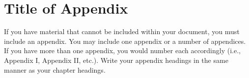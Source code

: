 \chapter{Title of Appendix}
If you have material that cannot be included within your document, you must include an appendix.
You may include one appendix or a number of appendices. If you have more than one appendix, you would number each accordingly (i.e., Appendix I, Appendix II, etc.). Write your appendix headings in the same manner as your chapter headings.